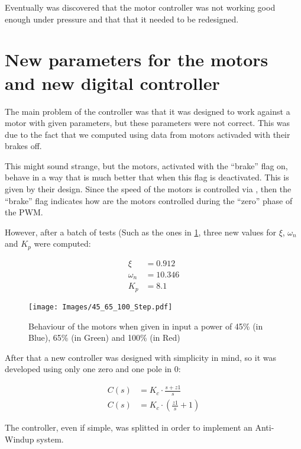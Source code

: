   Eventually was discovered that the motor controller was not working good
  enough under pressure and that that it needed to be redesigned.

\section{New parameters for the motors and new digital controller}

  The main problem of the controller was that it was designed to work
  against a motor with given parameters, but these parameters were not
  correct. This was due to the fact that we computed using data from motors
  activaded with their brakes off.

  This might sound strange, but the motors, activated with the ``brake''
  flag on, behave in a way that is much better that when this flag is
  deactivated. This is given by their design. Since the speed of the \nxt{}
  motors is controlled via , then the
  ``brake'' flag indicates how are the motors controlled during the
  ``zero'' phase of the PWM.

  However, after a batch of tests (Such as the ones in \ref{img:45_65_100},
  three new values for $\xi$, $\omega_n$ and $K_p$ were computed:

  \begin{align}\label{eqn:newXiWn}
    \xi &= 0.912 \\
    \omega_n &= 10.346 \\
    K_p &= 8.1
  \end{align}
 
  \begin{figure}[h!]
    \centering
    \texttt{[image: Images/45\_65\_100\_Step.pdf]}
    \caption{Behaviour of the motors when given in input a power of 45\%
    (in Blue), 65\% (in Green) and 100\% (in Red)\label{img:45_65_100}}
  \end{figure}

  After that a new controller was designed with simplicity in mind, so it
  was developed using only one zero and one pole in $0$:

  \begin{align}\label{eqn:LMController}
    C(s) &= K_c \cdot \frac{s + z1}{s} \\
    C(s) &= K_c \cdot (\frac{z1}{s} + 1)
  \end{align}


  The controller, even if simple, was splitted in order to implement an
  Anti-Windup system.

